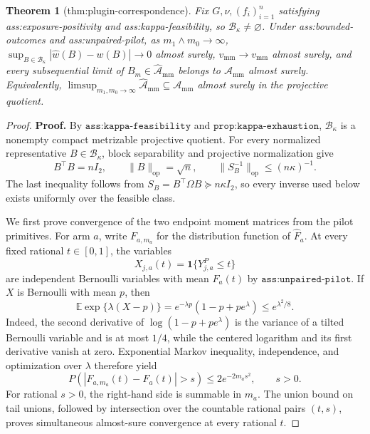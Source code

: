 \documentclass{article}
\newtheorem{theorem}{Theorem}
\begin{document}
\begin{theorem}[thm:plugin-correspondence]\label{thm:plugin-correspondence}
Fix \(G,\nu,(f_i)_{i=1}^n\) satisfying ass:exposure-positivity and ass:kappa-feasibility, so \(\mathcal B_\kappa\neq\varnothing\).  Under ass:bounded-outcomes and ass:unpaired-pilot, as \(m_1\wedge m_0\to\infty\), \(\sup_{B\in\mathcal B_\kappa}|\widehat w(B)-w(B)|\to0\) almost surely, \(\widehat v_{\mathrm{mm}}\to v_{\mathrm{mm}}\) almost surely, and every subsequential limit of \(B_m\in\widehat{\mathcal A}_{\mathrm{mm}}\) belongs to \(\mathcal A_{\mathrm{mm}}\) almost surely.  Equivalently, \(\limsup_{m_1,m_0\to\infty}\widehat{\mathcal A}_{\mathrm{mm}}\subseteq\mathcal A_{\mathrm{mm}}\) almost surely in the projective quotient.
\end{theorem}
\begin{proof}
\textbf{Proof.}
By \(\texttt{ass:kappa-feasibility}\) and \(\texttt{prop:kappa-exhaustion}\), \(\mathcal B_\kappa\) is a nonempty compact metrizable projective quotient.  For every normalized representative \(B\in\mathcal B_\kappa\), block separability and projective normalization give
\[
B^{\top}B=nI_2,
\qquad
\lVert B\rVert_{\mathrm{op}}=\sqrt n,
\qquad
\lVert S_B^{-1}\rVert_{\mathrm{op}}\le (n\kappa)^{-1}.
\tag{1}
\]
The last inequality follows from \(S_B=B^{\top}\Omega B\succeq n\kappa I_2\), so every inverse used below exists uniformly over the feasible class.

We first prove convergence of the two endpoint moment matrices from the pilot primitives.  For arm \(a\), write \(F_{a,m_a}\) for the distribution function of \(\widehat F_a\).  At every fixed rational \(t\in[0,1]\), the variables
\[
X_{j,a}(t)=\mathbf 1\{Y^P_{j,a}\le t\}
\]
are independent Bernoulli variables with mean \(F_a(t)\) by \(\texttt{ass:unpaired-pilot}\).  If \(X\) is Bernoulli with mean \(p\), then
\[
\mathbb E\exp\{\lambda(X-p)\}
=e^{-\lambda p}(1-p+pe^\lambda)\le e^{\lambda^2/8}.
\tag{2}
\]
Indeed, the second derivative of \(\log(1-p+pe^\lambda)\) is the variance of a tilted Bernoulli variable and is at most \(1/4\), while the centered logarithm and its first derivative vanish at zero.  Exponential Markov inequality, independence, and optimization over \(\lambda\) therefore yield
\[
P\!\left(\left|F_{a,m_a}(t)-F_a(t)\right|>s\right)
\le 2e^{-2m_as^2},
\qquad s>0.
\tag{3}
\]
For rational \(s>0\), the right-hand side is summable in \(m_a\).  The union bound on tail unions, followed by intersection over the countable rational pairs \((t,s)\), proves simultaneous almost-sure convergence at every rational \(t\).


\end{proof}
\end{document}
